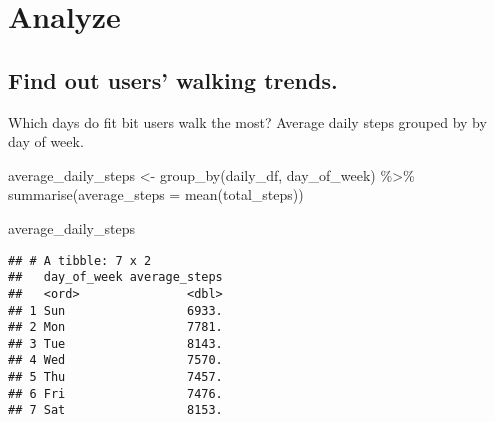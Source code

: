 \documentclass[
]{article}
\newenvironment{Shaded}{\begin{snugshade}}{\end{snugshade}}
\newcommand{\AttributeTok}[1]{\textcolor[rgb]{0.77,0.63,0.00}{#1}}
\newcommand{\FunctionTok}[1]{\textcolor[rgb]{0.00,0.00,0.00}{#1}}
\newcommand{\NormalTok}[1]{#1}
\newcommand{\OtherTok}[1]{\textcolor[rgb]{0.56,0.35,0.01}{#1}}
\newcommand{\SpecialCharTok}[1]{\textcolor[rgb]{0.00,0.00,0.00}{#1}}
\begin{document}
\hypertarget{analyze}{%
\section{Analyze}\label{analyze}}

\hypertarget{find-out-users-walking-trends.}{%
\subsection{Find out users' walking
trends.}\label{find-out-users-walking-trends.}}

Which days do fit bit users walk the most? Average daily steps grouped
by by day of week.

\begin{Shaded}
\begin{Highlighting}[]
\NormalTok{average\_daily\_steps }\OtherTok{\textless{}{-}} \FunctionTok{group\_by}\NormalTok{(daily\_df, day\_of\_week) }\SpecialCharTok{\%\textgreater{}\%} 
  \FunctionTok{summarise}\NormalTok{(}\AttributeTok{average\_steps =} \FunctionTok{mean}\NormalTok{(total\_steps))}

\NormalTok{average\_daily\_steps}
\end{Highlighting}
\end{Shaded}

\begin{verbatim}
## # A tibble: 7 x 2
##   day_of_week average_steps
##   <ord>               <dbl>
## 1 Sun                 6933.
## 2 Mon                 7781.
## 3 Tue                 8143.
## 4 Wed                 7570.
## 5 Thu                 7457.
## 6 Fri                 7476.
## 7 Sat                 8153.
\end{verbatim}
\end{document}

